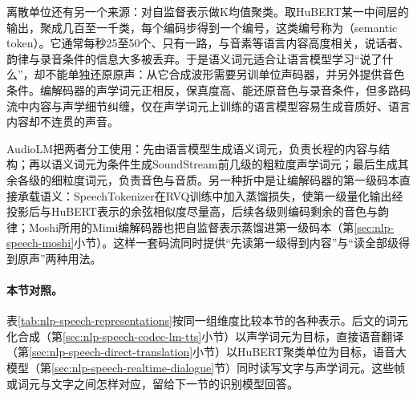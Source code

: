离散单位还有另一个来源：对自监督表示做K均值聚类。取HuBERT某一中间层的输出，聚成几百至一千类，每个编码步得到一个编号，这类编号称为（semantic token）。它通常每秒25至50个、只有一路，与音素等语言内容高度相关，说话者、韵律与录音条件的信息大多被丢弃。于是语义词元适合让语言模型学习“说了什么”，却不能单独还原原声：从它合成波形需要另训单位声码器，并另外提供音色条件。编解码器的声学词元正相反，保真度高、能还原音色与录音条件，但多路码流中内容与声学细节纠缠，仅在声学词元上训练的语言模型容易生成音质好、语言内容却不连贯的声音。

AudioLM把两者分工使用：先由语言模型生成语义词元，负责长程的内容与结构；再以语义词元为条件生成SoundStream前几级的粗粒度声学词元；最后生成其余各级的细粒度词元，负责音色与音质\cite{nlp-speech-borsos2023audiolm}。另一种折中是让编解码器的第一级码本直接承载语义：SpeechTokenizer在RVQ训练中加入蒸馏损失，使第一级量化输出经投影后与HuBERT表示的余弦相似度尽量高，后续各级则编码剩余的音色与韵律\cite{nlp-speech-zhang2024speechtokenizer}；Moshi所用的Mimi编解码器也把自监督表示蒸馏进第一级码本（第\ref{sec:nlp-speech-moshi}小节）。这样一套码流同时提供“先读第一级得到内容”与“读全部级得到原声”两种用法。

\paragraph{本节对照。}表\ref{tab:nlp-speech-representations}按同一组维度比较本节的各种表示。后文的词元化合成（第\ref{sec:nlp-speech-codec-lm-tts}小节）以声学词元为目标，直接语音翻译（第\ref{sec:nlp-speech-direct-translation}小节）以HuBERT聚类单位为目标，语音大模型（第\ref{sec:nlp-speech-realtime-dialogue}节）同时读写文字与声学词元。这些帧或词元与文字之间怎样对应，留给下一节的识别模型回答。

